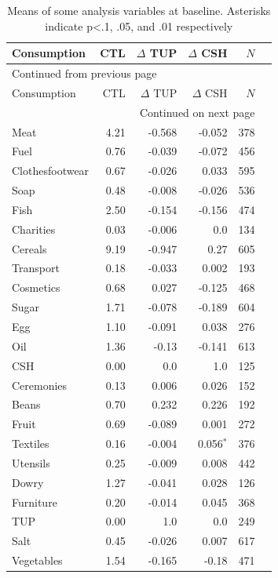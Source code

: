 \documentclass[12pt,article]{article}
\begin{document}
\begin{longtable}{lrrrrr}
\caption{\label{tab:orgtable1}
Means of some analysis variables at baseline.  Asterisks indicate p<.1, .05, and .01 respectively}
\\
\hline
Consumption & CTL & \(\Delta\) TUP & \(\Delta\) CSH & \(N\)\\
\hline
\endfirsthead
\multicolumn{5}{l}{Continued from previous page} \\
\hline

Consumption & CTL & \(\Delta\) TUP & \(\Delta\) CSH & \(N\) \\

\hline
\endhead
\hline\multicolumn{5}{r}{Continued on next page} \\
\endfoot
\endlastfoot
\hline
Meat & 4.21 & -0.568 & -0.052 & 378\\
Fuel & 0.76 & -0.039 & -0.072 & 456\\
Clothesfootwear & 0.67 & -0.026 & 0.033 & 595\\
Soap & 0.48 & -0.008 & -0.026 & 536\\
Fish & 2.50 & -0.154 & -0.156 & 474\\
Charities & 0.03 & -0.006 & 0.0 & 134\\
Cereals & 9.19 & -0.947 & 0.27 & 605\\
Transport & 0.18 & -0.033 & 0.002 & 193\\
Cosmetics & 0.68 & 0.027 & -0.125 & 468\\
Sugar & 1.71 & -0.078 & -0.189 & 604\\
Egg & 1.10 & -0.091 & 0.038 & 276\\
Oil & 1.36 & -0.13 & -0.141 & 613\\
CSH & 0.00 & 0.0 & 1.0 & 125\\
Ceremonies & 0.13 & 0.006 & 0.026 & 152\\
Beans & 0.70 & 0.232 & 0.226 & 192\\
Fruit & 0.69 & -0.089 & 0.001 & 272\\
Textiles & 0.16 & -0.004 & 0.056\(^{\text{*}}\) & 376\\
Utensils & 0.25 & -0.009 & 0.008 & 442\\
Dowry & 1.27 & -0.041 & 0.028 & 126\\
Furniture & 0.20 & -0.014 & 0.045 & 368\\
TUP & 0.00 & 1.0 & 0.0 & 249\\
Salt & 0.45 & -0.026 & 0.007 & 617\\
Vegetables & 1.54 & -0.165 & -0.18 & 471\\

\end{longtable}
\end{document}
